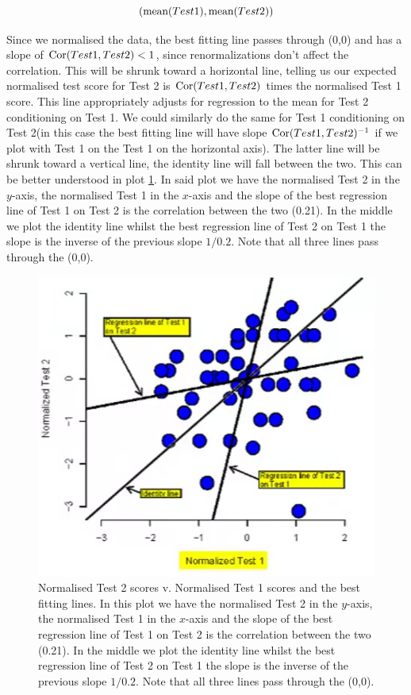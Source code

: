 \documentclass{homework}
\begin{document}
$$
(\textnormal{mean}(Test1), \textnormal{mean}(Test2))
$$

Since we normalised the data, the best fitting line passes through (0,0) and has a slope of $\textnormal{Cor}(Test1, Test2) < 1$, since renormalizations don't affect the correlation. This will be shrunk toward a horizontal line, telling us our expected normalised test score for Test 2 is $\textnormal{Cor}(Test1, Test2)$ times the normalised Test 1 score. This line appropriately adjusts for regression to the mean for Test 2 conditioning on Test 1. We could similarly do the same for Test 1 conditioning on Test 2(in this case the best fitting line will have slope  
$\textnormal{Cor}(Test1, Test2)^{-1}$ if we plot with Test 1 on the Test 1 on the horizontal axis). The latter line will be shrunk toward a vertical line, the identity line will fall between the two. This can be better understood in plot \ref{fig: NTest2 v. NTest1}. In said plot we have the normalised Test 2 in the $y$-axis, the normalised Test 1 in the $x$-axis and the slope of the best regression line of Test 1 on Test 2 is the correlation between the two (0.21). In the middle we plot the identity line whilst the best regression line of Test 2 on Test 1 the slope is the inverse of the previous slope $1/0.2$. Note that all three lines pass through the (0,0).

\begin{figure}
    \centering
    \includegraphics[scale=0.4]{figs/Normalised Test 2 v. Normalised Test 1 (adjusted).png}
    \caption{Normalised Test 2 scores v. Normalised Test 1 scores and the best fitting lines.  In this plot we have the normalised Test 2 in the $y$-axis, the normalised Test 1 in the $x$-axis and the slope of the best regression line of Test 1 on Test 2 is the correlation between the two (0.21). In the middle we plot the identity line whilst the best regression line of Test 2 on Test 1 the slope is the inverse of the previous slope $1/0.2$. Note that all three lines pass through the (0,0).}
    \label{fig: NTest2 v. NTest1}
\end{figure}
\end{document}
